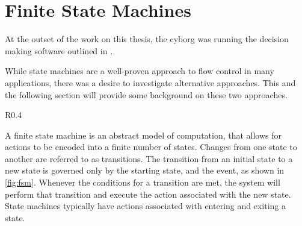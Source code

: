 \documentclass[\rootfolder/main.tex]{subfiles}
\begin{document}







\section{Finite State Machines}

At the outset of the work on this thesis, the cyborg was running the decision making software outlined in \cite{Andersen2017}.

While state machines are a well-proven approach to flow control in many applications, there was a desire to investigate alternative approaches.
This and the following section will provide some background on these two approaches.

\begin{wrapfigure}{R}{0.4\columnwidth}
    \caption{An example of a simple state machine.}
    \label{fig:fsm}
\end{wrapfigure}

A finite state machine is an abstract model of computation, that allows for actions to be encoded into a finite number of states.
Changes from one state to another are referred to as transitions.
The transition from an initial state to a new state is governed only by the starting state, and the event, as shown in \cref{fig:fsm}.
Whenever the conditions for a transition are met, the system will perform that transition and execute the action associated with the new state.
State machines typically have actions associated with entering and exiting a state.
\end{document}
